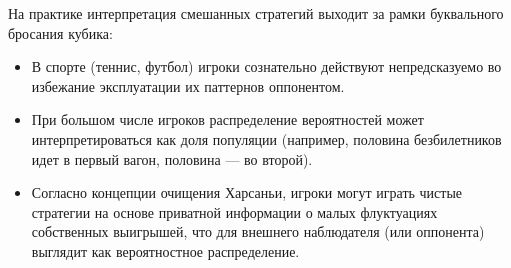 На практике интерпретация смешанных стратегий выходит за рамки буквального бросания кубика:
\begin{itemize}
    \item В спорте (теннис, футбол) игроки сознательно действуют непредсказуемо во избежание эксплуатации их паттернов оппонентом.
    \item При большом числе игроков распределение вероятностей может интерпретироваться как доля популяции (например, половина безбилетников идет в первый вагон, половина — во второй).
    \item Согласно концепции очищения Харсаньи, игроки могут играть чистые стратегии на основе приватной информации о малых флуктуациях собственных выигрышей, что для внешнего наблюдателя (или оппонента) выглядит как вероятностное распределение.
\end{itemize}

